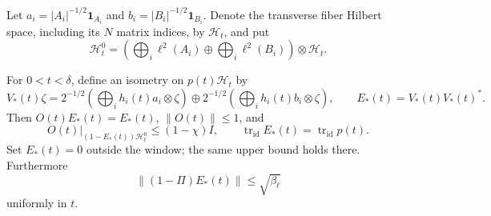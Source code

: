 Let $a_i=|A_i|^{-1/2}\mathbf1_{A_i}$ and
$b_i=|B_i|^{-1/2}\mathbf1_{B_i}$. Denote the transverse fiber Hilbert space,
including its $N$ matrix indices, by $\mathcal H_t$, and put
\[
 \mathcal H^0_t=
 \left(\bigoplus_i\ell^2(A_i)\oplus\bigoplus_i\ell^2(B_i)\right)
       \otimes\mathcal H_t.
\]

\begin{lemma}
\label{spec:model}
For $0<t<\delta$, define an isometry on $p(t)\mathcal H_t$ by
\begin{equation}
 V_*(t)\zeta=2^{-1/2}
 \left(\bigoplus_i h_i(t)a_i\otimes\zeta\right)
 \oplus
 2^{-1/2}\left(\bigoplus_i h_i(t)b_i\otimes\zeta\right),
 \qquad E_*(t)=V_*(t)V_*(t)^*.
 \label{spec:model-isometry}
\end{equation}
Then $O(t)E_*(t)=E_*(t)$, $\|O(t)\|\leq1$, and
\begin{equation}
 O(t)|_{(1-E_*(t))\mathcal H^0_t}\leq(1-\chi)I,
 \qquad
 \operatorname{tr}_{\mathrm{id}}E_*(t)
       =\operatorname{tr}_{\mathrm{id}}p(t).
 \label{spec:model-gap-trace}
\end{equation}
Set $E_*(t)=0$ outside the window; the same upper bound holds there.
Furthermore
\begin{equation}
       \|(1-\Pi)E_*(t)\|\leq\sqrt{\beta_\ell}
 \label{spec:model-cut}
\end{equation}
uniformly in $t$.
\end{lemma}

